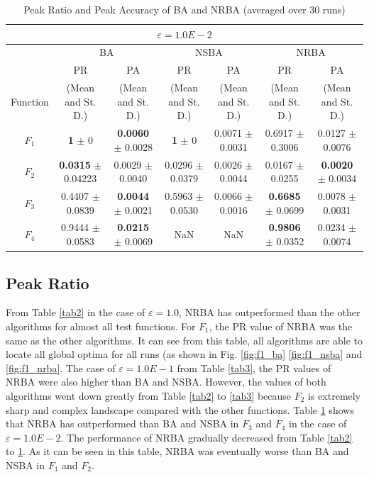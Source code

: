 \documentclass[conference]{IEEEtran}
\begin{document}
\begin{table}[h]
\caption{Peak Ratio and Peak Accuracy of BA and NRBA (averaged over 30 runs)}
\begin{center}
\begin{tabular}{c|c|c|c|c|c|c}
\multicolumn{7}{c}{$\varepsilon = 1.0E-2$} \\
\hline
\multicolumn{1}{c|}{} & \multicolumn{2}{c|}{BA} & \multicolumn{2}{c|}{NSBA} & \multicolumn{2}{c}{NRBA} \\
\hline
 & PR & PA & PR & PA & PR & PA \\

Function & (Mean and St. D.) & (Mean and St. D.) & (Mean and St. D.) & (Mean and St. D.) & (Mean and St. D.) & (Mean and St. D.) \\
\hline
$F_1 $ & {\bf 1} $\pm$ 0 & {\bf 0.0060} $\pm$ 0.0028 & {\bf 1} $\pm$ 0 & 0.0071 $\pm$ 0.0031 & 0.6917 $\pm$ 0.3006 & 0.0127 $\pm$ 0.0076  \\
\hline
$F_2 $ & {\bf 0.0315} $\pm$ 0.04223 & 0.0029 $\pm$ 0.0040 & 0.0296 $\pm$ 0.0379 & 0.0026 $\pm$ 0.0044 & 0.0167 $\pm$ 0.0255 & {\bf 0.0020} $\pm$ 0.0034 \\
\hline
$F_3 $ & 0.4407 $\pm$ 0.0839 & {\bf 0.0044} $\pm$ 0.0021 & 0.5963 $\pm$ 0.0530 & 0.0066 $\pm$ 0.0016 & {\bf 0.6685} $\pm$ 0.0699 & 0.0078 $\pm$ 0.0031 \\
\hline
$F_4 $ & 0.9444 $\pm$ 0.0583 & {\bf 0.0215} $\pm$ 0.0069 & NaN & NaN & {\bf 0.9806} $\pm$ 0.0352 & 0.0234 $\pm$ 0.0074 \\
\hline
\end{tabular}
\label{tab4}
\end{center}
\end{table}



\subsection{Peak Ratio}
From Table \ref{tab2} in the case of $\varepsilon = 1.0$, NRBA has outperformed than the other algorithms for almost all test functions. For $F_1$, the PR value of NRBA was the same as the other algorithms. It can see from this table, all algorithms are able to locate all global optima for all runs (as shown in Fig. \ref{fig:f1_ba} \ref{fig:f1_nsba} and \ref{fig:f1_nrba}. The case of $\varepsilon=1.0E-1$ from Table \ref{tab3}, the PR values of NRBA were also higher than BA and NSBA. However, the values of both algorithms went down greatly from Table \ref{tab2} to \ref{tab3} because $F_2$ is extremely sharp and complex landscape compared with the other functions. Table \ref{tab4} shows that NRBA has outperformed than BA and NSBA in $F_3$ and $F_4$ in the case of $\varepsilon = 1.0E-2$. The performance of NRBA gradually decreased from Table \ref{tab2} to \ref{tab4}. As it can be seen in this table, NRBA was eventually worse than BA and NSBA in $F_1$ and $F_2$. 
\end{document}
